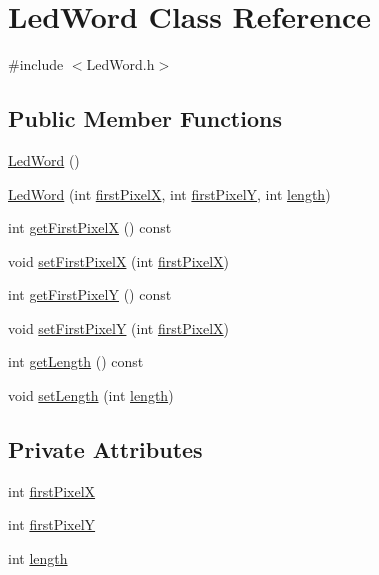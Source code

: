 \hypertarget{class_led_word}{}\section{Led\+Word Class Reference}
\label{class_led_word}


{\ttfamily \#include $<$Led\+Word.\+h$>$}

\subsection*{Public Member Functions}
\begin{DoxyCompactItemize}
\item 
\mbox{\hyperlink{class_led_word_ac6eaebc78df7dae57ee83e21d400d9cf}{Led\+Word}} ()
\item 
\mbox{\hyperlink{class_led_word_a3be466e30df512d7d4baf1e48819df48}{Led\+Word}} (int \mbox{\hyperlink{class_led_word_aa6052f570a53041fd3c301bd32b3f52a}{first\+PixelX}}, int \mbox{\hyperlink{class_led_word_a9b5fd331725bcdfcae12fec2ca1bd61e}{first\+PixelY}}, int \mbox{\hyperlink{class_led_word_a8c96d7c16c944052c6ef13f3b30e6385}{length}})
\item 
int \mbox{\hyperlink{class_led_word_adb0caa32752f9d86c7a2b40baaf7b8b2}{get\+First\+PixelX}} () const
\item 
void \mbox{\hyperlink{class_led_word_aa90a6ff178e09029cf8ab8b206d3872c}{set\+First\+PixelX}} (int \mbox{\hyperlink{class_led_word_aa6052f570a53041fd3c301bd32b3f52a}{first\+PixelX}})
\item 
int \mbox{\hyperlink{class_led_word_ab8c7b9c8e218b3b0f9aabfd2a0134679}{get\+First\+PixelY}} () const
\item 
void \mbox{\hyperlink{class_led_word_a240f0b27e0ad573ae91bbd036213ad25}{set\+First\+PixelY}} (int \mbox{\hyperlink{class_led_word_aa6052f570a53041fd3c301bd32b3f52a}{first\+PixelX}})
\item 
int \mbox{\hyperlink{class_led_word_a5c3b00f43585783fa56a4c2d2fc1eb41}{get\+Length}} () const
\item 
void \mbox{\hyperlink{class_led_word_a5f7dbc94bd68492b0e4f2340d3d0421f}{set\+Length}} (int \mbox{\hyperlink{class_led_word_a8c96d7c16c944052c6ef13f3b30e6385}{length}})
\end{DoxyCompactItemize}
\subsection*{Private Attributes}
\begin{DoxyCompactItemize}
\item 
int \mbox{\hyperlink{class_led_word_aa6052f570a53041fd3c301bd32b3f52a}{first\+PixelX}}
\item 
int \mbox{\hyperlink{class_led_word_a9b5fd331725bcdfcae12fec2ca1bd61e}{first\+PixelY}}
\item 
int \mbox{\hyperlink{class_led_word_a8c96d7c16c944052c6ef13f3b30e6385}{length}}
\end{DoxyCompactItemize}


